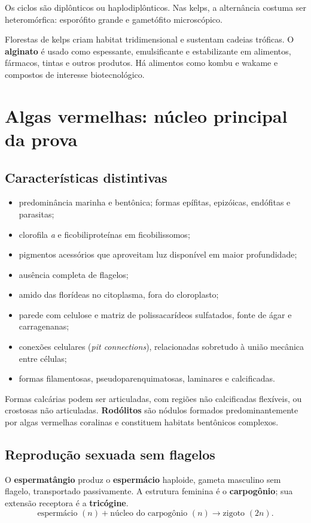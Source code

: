 \documentclass[12pt,a4paper]{article}
\begin{document}
Os ciclos são diplônticos ou haplodiplônticos. Nas kelps, a alternância costuma
ser heteromórfica: esporófito grande e gametófito microscópico.

Florestas de kelps criam habitat tridimensional e sustentam cadeias tróficas. O
\textbf{alginato} é usado como espessante, emulsificante e estabilizante em
alimentos, fármacos, tintas e outros produtos. Há alimentos como kombu e wakame
e compostos de interesse biotecnológico.

\section{Algas vermelhas: núcleo principal da prova}

\subsection{Características distintivas}
\begin{itemize}
\item predominância marinha e bentônica; formas epífitas, epizóicas, endófitas e
parasitas;
\item clorofila \textit{a} e ficobiliproteínas em ficobilissomos;
\item pigmentos acessórios que aproveitam luz disponível em maior profundidade;
\item ausência completa de flagelos;
\item amido das florídeas no citoplasma, fora do cloroplasto;
\item parede com celulose e matriz de polissacarídeos sulfatados, fonte de ágar
e carragenanas;
\item conexões celulares (\textit{pit connections}), relacionadas sobretudo à
união mecânica entre células;
\item formas filamentosas, pseudoparenquimatosas, laminares e calcificadas.
\end{itemize}

Formas calcárias podem ser articuladas, com regiões não calcificadas flexíveis,
ou crostosas não articuladas. \textbf{Rodólitos} são nódulos formados
predominantemente por algas vermelhas coralinas e constituem habitats bentônicos
complexos.

\subsection{Reprodução sexuada sem flagelos}
O \textbf{esperma\-tângio} produz o \textbf{espermácio} haploide, gameta masculino
sem flagelo, transportado passivamente. A estrutura feminina é o
\textbf{carpogônio}; sua extensão receptora é a \textbf{tricógine}.
\[
\text{espermácio }(n)+\text{núcleo do carpogônio }(n)
\longrightarrow \text{zigoto }(2n).
\]
\end{document}
